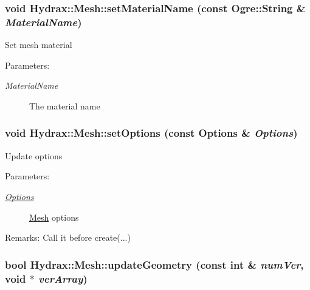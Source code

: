 \begin{CompactItemize}
{\subsubsection[{setMaterialName}]{\setlength{\rightskip}{0pt plus 5cm}void Hydrax::Mesh::setMaterialName (const Ogre::String \& {\em MaterialName})}}
\label{class_hydrax_1_1_mesh_43b930f0d0e03f95799de998780727cc}


Set mesh material \begin{Desc}
\item[Parameters:]
\begin{description}
\item[{\em MaterialName}]The material name \end{description}
\end{Desc}
\hypertarget{class_hydrax_1_1_mesh_69d55fde534e5a28044ef088b11774fb}{
\subsubsection[{setOptions}]{\setlength{\rightskip}{0pt plus 5cm}void Hydrax::Mesh::setOptions (const {\bf Options} \& {\em Options})}}
\label{class_hydrax_1_1_mesh_69d55fde534e5a28044ef088b11774fb}


Update options \begin{Desc}
\item[Parameters:]
\begin{description}
\item[{\em \hyperlink{struct_hydrax_1_1_mesh_1_1_options}{Options}}]\hyperlink{class_hydrax_1_1_mesh}{Mesh} options \end{description}
\end{Desc}
\begin{Desc}
\item[Remarks:]Call it before create(...) \end{Desc}
\hypertarget{class_hydrax_1_1_mesh_7eecc57d699ca2c4eadbcfd9db584f7a}{
\subsubsection[{updateGeometry}]{\setlength{\rightskip}{0pt plus 5cm}bool Hydrax::Mesh::updateGeometry (const int \& {\em numVer}, \/  void $\ast$ {\em verArray})}}
\label{class_hydrax_1_1_mesh_7eecc57d699ca2c4eadbcfd9db584f7a}



\end{CompactItemize}
